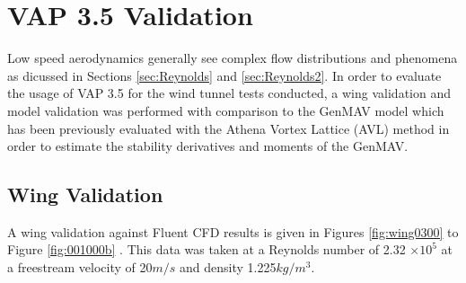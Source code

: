 \section{VAP 3.5 Validation}
Low speed aerodynamics generally see complex flow distributions and phenomena as dicussed in Sections \ref{sec:Reynolds} and \ref{sec:Reynolds2}. In order to evaluate the usage of VAP 3.5 for the wind tunnel tests conducted, a wing validation and model validation was performed with comparison to the GenMAV model which has been previously evaluated with the Athena Vortex Lattice (AVL) method in order to estimate the stability derivatives and moments of the GenMAV. 

\subsection{Wing Validation}
A wing validation against Fluent CFD results is given in Figures \ref{fig:wing0300} to Figure \ref{fig:001000b} \cite{}. This data was taken at a Reynolds number of 2.32 $\times 10^{5}$ at a freestream velocity of 20$m/s$ and density 1.225$kg/m^3$. 

